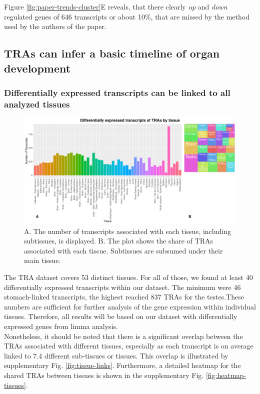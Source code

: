 \documentclass[
]{article}
\begin{document}
Figure \ref{fig:paper-trends-cluster}E reveals, that there clearly \emph{up} and \emph{down} regulated genes of 646 transcripts or about 10\%, that are missed by the method used by the authors of the paper.

\hypertarget{organ}{%
\subsection{TRAs can infer a basic timeline of organ development}\label{organ}}

\hypertarget{organ-overview}{%
\subsubsection{Differentially expressed transcripts can be linked to all analyzed tissues}\label{organ-overview}}

\begin{figure}
\centering
\includegraphics{final_report_files/figure-latex/unnamed-chunk-6-1.pdf}
\caption{\label{fig:unnamed-chunk-6}A. The number of transcripts associated with each tissue, including subtissues, is displayed. B. The plot shows the share of TRAs associated with each tissue. Subtissues are subsumed under their main tissue.}
\end{figure}

The TRA dataset covers 53 distinct tissues. For all of those, we found at least 40 differentially expressed transcripts within our dataset. The minimum were 46 stomach-linked transcripts, the highest reached 837 TRAs for the testes.These numbers are sufficient for further analysis of the gene expression within individual tissues. Therefore, all results will be based on our dataset with differentially expressed genes from limma analysis.\\
Nonetheless, it should be noted that there is a significant overlap between the TRAs associated with different tissues, especially as each transcript is on average linked to 7.4 different sub-tissues or tissues. This overlap is illustrated by supplementary Fig. \ref{fig:tissue-links}. Furthermore, a detailed heatmap for the shared TRAs between tissues is shown in the supplementary Fig. \ref{fig:heatmap-tissues}.
\end{document}
